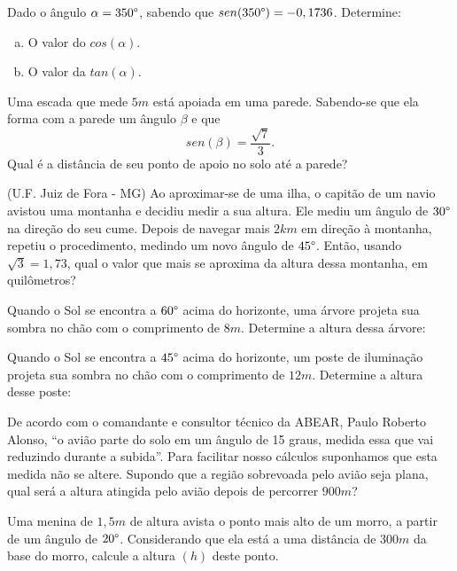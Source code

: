  \begin{exer}
 Dado o ângulo $\alpha= 350\degree$, sabendo que $sen(350\degree)= -0,1736$. Determine:
 \begin{enumerate}[a)]
 \item O valor do $cos(\alpha)$.
 \item O valor da $tan(\alpha)$.
 \end{enumerate}
 \end{exer}
 
 \begin{exer}
 Uma escada que mede $5m$ está apoiada em uma parede. Sabendo-se que ela forma com a parede um ângulo $\beta$ e que
\[sen(\beta)=\frac{\sqrt{7}}{3}.\]
Qual é a distância de seu ponto de apoio no solo até a parede?
 \end{exer}
 
 \begin{exer}
 (U.F. Juiz de Fora - MG) Ao aproximar-se de uma ilha, o capitão de um navio avistou uma montanha e decidiu medir a sua altura. Ele mediu um ângulo de $30\degree$ na direção do seu cume. Depois de navegar mais $2 km$ em direção à montanha, repetiu o procedimento, medindo um novo ângulo de $45\degree$. Então, usando $\sqrt{3} = 1,73$, qual o valor que mais se aproxima da altura dessa montanha, em quilômetros? 
 \end{exer}
 
 \begin{exer}
 Quando o Sol se encontra a $60\degree$ acima do horizonte, uma árvore projeta sua sombra no chão com o comprimento de $8 m$. Determine a altura dessa árvore:
 \end{exer}
 
 \begin{exer}
 Quando o Sol se encontra a $45\degree$ acima do horizonte, um poste de iluminação projeta sua sombra no chão com o comprimento de $12 m$. Determine a altura desse poste:
 \end{exer}
 
 \begin{exer}
 De acordo com o comandante e consultor técnico da ABEAR, Paulo Roberto Alonso, “o avião parte do solo em um ângulo de 15 graus, medida essa que vai reduzindo durante a subida”. Para facilitar nosso cálculos suponhamos que esta medida não se altere. Supondo que a região sobrevoada pelo avião seja plana, qual será a altura atingida pelo avião depois de percorrer $900 m$?
 \end{exer}
 
 \begin{exer}
 Uma menina de $1,5m$ de altura avista o ponto mais alto de um morro, a partir de um ângulo de $20\degree$. Considerando que ela está a uma distância de $300m$ da base do morro, calcule a altura $(h)$ deste ponto.
 \end{exer}
 
